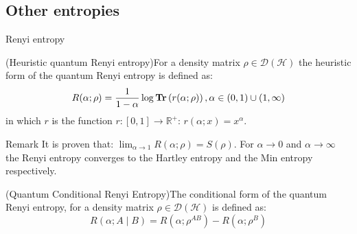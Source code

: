 \documentclass{beamer}
\begin{document}
\subsection{Other entropies}
\begin{frame}{Renyi entropy}
\begin{scriptsize}
\begin{definition}(Heuristic quantum Renyi entropy)For a density matrix $\rho \in \mathcal{D}(\mathcal{H})$ the heuristic form of the quantum Renyi entropy is defined as:
\begin{equation*}
R(\alpha ; \rho)= \frac{1}{1-\alpha} \log \operatorname{\textup{\textbf{Tr}}} \left(r(\alpha;\rho)\right), \alpha \in(0,1) \cup(1, \infty)
\end{equation*}
in which $r$ is the function $r:[0,1] \rightarrow \mathbb{R^{+}}$: $r(\alpha;x)=x^{\alpha}$.
\end{definition}
\begin{alertblock}{Remark}
It is proven that: $\lim _{\alpha \rightarrow 1} R(\alpha;\rho)=S(\rho)$. For $\alpha \to 0$ and $\alpha \to \infty$ the Renyi entropy converges to the Hartley entropy and the Min entropy respectively.
\end{alertblock}
\begin{definition}(Quantum Conditional Renyi Entropy)The conditional form of the quantum Renyi entropy, for a density matrix $\rho \in \mathcal{D}(\mathcal{H})$ is defined as:
\begin{equation*}
R(\alpha;A \mid B)=R(\alpha;\rho^{AB})-R(\alpha;\rho^B)
\end{equation*}
\end{definition}
\end{scriptsize}
\end{frame}
\end{document}
